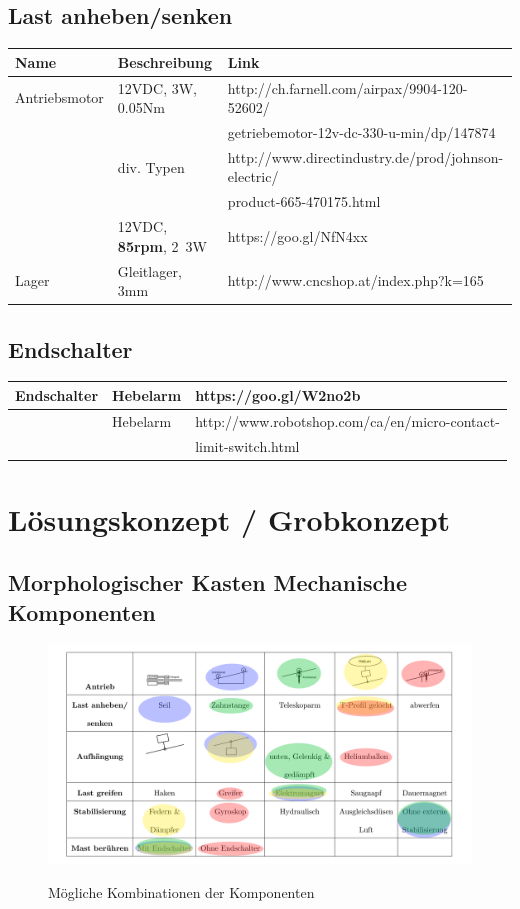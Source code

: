 \documentclass[a4paper]{report}
\begin{document}
\section{Last anheben/senken}
\begin{tabular}{|l|l|l|}
	\hline
	\textbf{Name} & \textbf{Beschreibung} &\textbf{Link}\\
	\hline 
	Antriebsmotor&12VDC, 3W, 0.05Nm&
	http://ch.farnell.com/airpax/9904-120-52602/\\
	&&getriebemotor-12v-dc-330-u-min/dp/147874  \\ 
	\hline 
	& div. Typen &http://www.directindustry.de/prod/johnson-electric/\\&&product-665-470175.html\\ 
	\hline 
	&12VDC, \textbf{85rpm}, 2~3W&https://goo.gl/NfN4xx\\
	\hline
	Lager&Gleitlager, 3mm&http://www.cncshop.at/index.php?k=165\\
	\hline
\end{tabular}

	\section{Endschalter}
	\begin{tabular}{|l|l|l|}
	\hline	
	Endschalter&Hebelarm&https://goo.gl/W2no2b\\
	\hline
	&Hebelarm&http://www.robotshop.com/ca/en/micro-contact-\\
	&&limit-switch.html\\
	\hline
\end{tabular} 

\chapter{Lösungskonzept / Grobkonzept}
\section{Morphologischer Kasten Mechanische Komponenten}
\begin{figure}[h!]
	\includegraphics[keepaspectratio,width=\textwidth]{MorphKasten}
	\label{fig:Morphkasten}
	\caption{Mögliche Kombinationen der Komponenten}
\end{figure}
\end{document}
